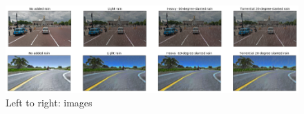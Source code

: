 \begin{figure}[h!]
\centering
\includegraphics[width=\textwidth]{Figures/AutomoldRain.png}
\caption{Left to right: images}
\label{fig:AutomoldRoadAugmentationLibrary}
\end{figure}


